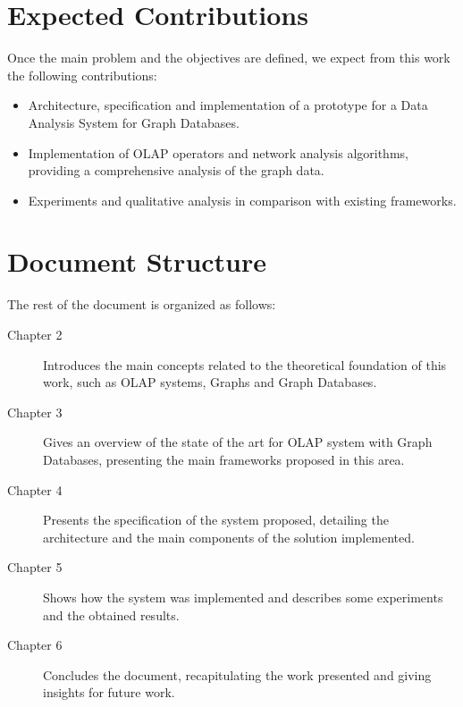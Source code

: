 \section{Expected Contributions}
Once the main problem and the objectives are defined, we expect from this work the following contributions:

\begin{itemize}
\item Architecture, specification and implementation of a prototype for a Data Analysis System for Graph Databases.
\item Implementation of OLAP operators and network analysis algorithms, providing a comprehensive analysis of the graph data.
\item Experiments and qualitative analysis in comparison with existing frameworks.
\end{itemize}


\section{Document Structure}
The rest of the document is organized as follows:
\begin{description}
\item[Chapter 2] Introduces the main concepts related to the theoretical foundation of this work, such as OLAP systems, Graphs and Graph Databases.
\item[Chapter 3] Gives an overview of the state of the art for OLAP system with Graph Databases, presenting the main frameworks proposed in this area.
\item[Chapter 4] Presents the specification of the system proposed, detailing the architecture and the main components of the solution implemented.
\item[Chapter 5] Shows how the system was implemented and describes some experiments and the obtained results.
\item[Chapter 6] Concludes the document, recapitulating the work presented and giving insights for future work.
\end{description}